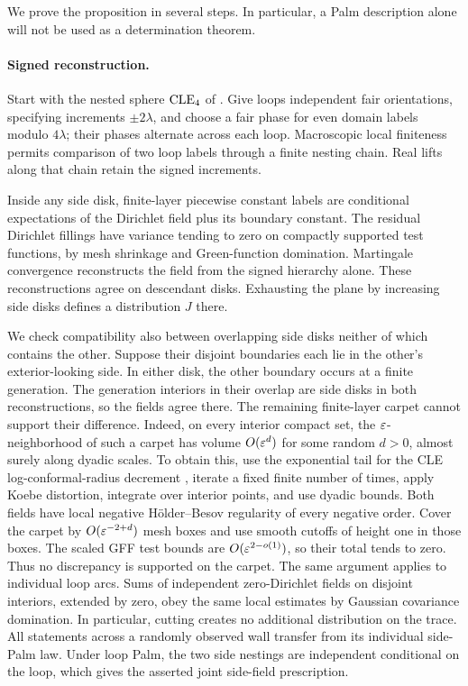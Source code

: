 We prove the proposition in several steps.  In particular, a Palm description alone will not be used as a determination theorem.

\paragraph{Signed reconstruction.}
Start with the nested sphere $\mathrm{CLE}_4$ of \cite{KWnested}.  Give loops independent fair orientations, specifying increments $\pm2\lambda$, and choose a fair phase for even domain labels modulo $4\lambda$; their phases alternate across each loop.  Macroscopic local finiteness permits comparison of two loop labels through a finite nesting chain.  Real lifts along that chain retain the signed increments.

Inside any side disk, finite-layer piecewise constant labels are conditional expectations of the Dirichlet field plus its boundary constant.  The residual Dirichlet fillings have variance tending to zero on compactly supported test functions, by mesh shrinkage and Green-function domination.  Martingale convergence reconstructs the field from the signed hierarchy alone.  These reconstructions agree on descendant disks.  Exhausting the plane by increasing side disks defines a distribution $J$ there.

We check compatibility also between overlapping side disks neither of which contains the other.  Suppose their disjoint boundaries each lie in the other's exterior-looking side.  In either disk, the other boundary occurs at a finite generation.  The generation interiors in their overlap are side disks in both reconstructions, so the fields agree there.  The remaining finite-layer carpet cannot support their difference.  Indeed, on every interior compact set, the $\varepsilon$-neighborhood of such a carpet has volume $O(\varepsilon^d)$ for some random $d>0$, almost surely along dyadic scales.  To obtain this, use the exponential tail for the CLE log-conformal-radius decrement \cite{SSWradii}, iterate a fixed finite number of times, apply Koebe distortion, integrate over interior points, and use dyadic bounds.  Both fields have local negative H\"older--Besov regularity of every negative order.  Cover the carpet by $O(\varepsilon^{-2+d})$ mesh boxes and use smooth cutoffs of height one in those boxes.  The scaled GFF test bounds are $O(\varepsilon^{2-o(1)})$, so their total tends to zero.  Thus no discrepancy is supported on the carpet.  The same argument applies to individual loop arcs.  Sums of independent zero-Dirichlet fields on disjoint interiors, extended by zero, obey the same local estimates by Gaussian covariance domination.  In particular, cutting creates no additional distribution on the trace.  All statements across a randomly observed wall transfer from its individual side-Palm law.  Under loop Palm, the two side nestings are independent conditional on the loop, which gives the asserted joint side-field prescription.


